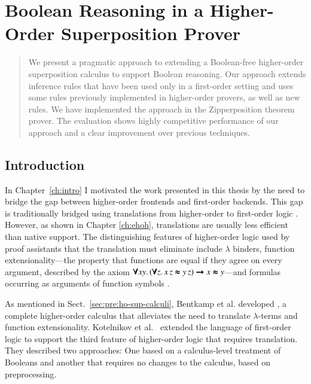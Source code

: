 \chapter{Boolean Reasoning in a Higher-Order Superposition Prover}
\label{ch:bools}




\begin{abstract}
    We present a pragmatic approach to extending a Boolean-free higher-order
    superposition calculus to support Boolean reasoning. Our approach extends
    inference rules that have been used only in a first-order setting and uses some
    rules previously implemented in higher-order provers, as well as new rules.
    We have implemented the approach in the Zipperposition
    theorem prover. The evaluation shows highly competitive performance of our approach
    and a clear improvement over previous techniques.
\end{abstract}

\newpage

\section{Introduction} 
\label{sect:bool:introduction}

In Chapter~\ref{ch:intro} I motivated the work presented in this thesis by the need to bridge the gap
between higher-order frontends and first-order backends. This gap is
traditionally bridged using translations from higher-order to
first-order logic \cite{ar-70-hol, mp-08-trans}. However, as shown in Chapter
\ref{ch:ehoh}, translations are usually less efficient than native support. The
distinguishing features of higher-order logic used by proof assistants that the
translation must eliminate include $\lambda$ binders, function
extensionality---the property that functions are equal if they agree on every
argument, described by the axiom $\pmb{\forall} xy. \allowbreak\, (\pmb{\forall} z. \, x
\, z \pmb{\approx} y \,z) \pmb{\rightarrow} x \pmb{\approx} y$---and formulas occurring as arguments of
function symbols \cite{mp-08-trans}.


As mentioned in Sect.~\ref{sec:pre:ho-sup-calculi}, Bentkamp et al. developed
\lsup{}, a complete higher-order calculus that alleviates the need to translate
$\lambda$-terms and function extensionality. Kotelnikov et al.\
\cite{kotelnikov-15-fool,kotelnikov-16-fool} extended the language of
first-order logic to support the third feature of higher-order logic that
requires translation. They described two approaches: One based on a calculus-level
treatment of Booleans and another that requires no changes to the calculus,
based on preprocessing.

